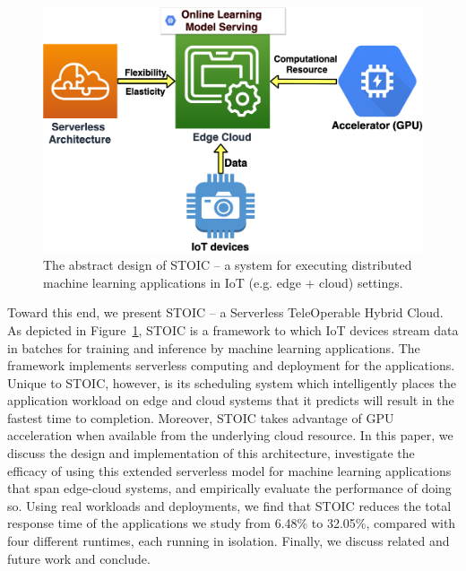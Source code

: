 \begin{figure}
    \centering
    \includegraphics[scale=0.25]{figures/edge}
    \caption{The abstract design of STOIC -- a system for executing distributed machine learning applications in IoT (e.g. edge + cloud) settings.
\label{fig:edge}}
\end{figure}

Toward this end, we present STOIC -- a Serverless TeleOperable Hybrid Cloud. As depicted in Figure~\ref{fig:edge}, STOIC is a framework to which IoT devices stream data in batches for training and inference by machine learning applications.  The framework implements serverless computing and deployment for the applications. Unique to STOIC, however, is its scheduling system which intelligently places the application workload on edge and cloud systems that it predicts will result in the fastest time to completion. Moreover, STOIC takes advantage of GPU acceleration when available from the underlying cloud resource. In this paper, we discuss the design and implementation of this architecture, investigate the efficacy of using this extended serverless model for machine learning applications that span edge-cloud systems, and  empirically evaluate the performance of doing so. Using real workloads and deployments, we find that STOIC reduces the total response time of the applications we study from 6.48\% to 32.05\%, compared with four different runtimes, each running in isolation. Finally, we discuss related and future work and conclude.
